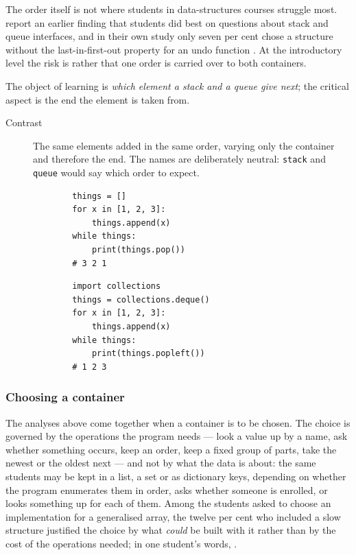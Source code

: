 The order itself is not where students in data-structures courses struggle
most. \textcite[p.~170]{Zingaro2018DataStructures} report an earlier finding
that students did best on questions about stack and queue interfaces, and in
their own study only seven per cent chose a structure without the
last-in-first-out property for an undo function
\autocite[p.~173]{Zingaro2018DataStructures}. At the introductory level the
risk is rather that one order is carried over to both containers.

The object of learning is \emph{which element a stack and a queue give next};
the critical aspect is the end the element is taken from.

\begin{description}
  \item[Contrast] The same elements added in the same order, varying only the
    container and therefore the end. The names are deliberately neutral:
    \texttt{stack} and \texttt{queue} would say which
    order to expect.

    \hfill
    \begin{minipage}[t]{0.45\columnwidth}
      \begin{verbatim}
        things = []
        for x in [1, 2, 3]:
            things.append(x)
        while things:
            print(things.pop())
        # 3 2 1
      \end{verbatim}
    \end{minipage}
    \hfill
    \begin{minipage}[t]{0.45\columnwidth}
      \begin{verbatim}
        import collections
        things = collections.deque()
        for x in [1, 2, 3]:
            things.append(x)
        while things:
            print(things.popleft())
        # 1 2 3
      \end{verbatim}
    \end{minipage}
\end{description}

\subsubsection{Choosing a container}

The analyses above come together when a container is to be chosen. The choice
is governed by the operations the program needs --- look a value up by a name,
ask whether something occurs, keep an order, keep a fixed group of parts, take
the newest or the oldest next --- and not by what the data is about: the same
students may be kept in a list, a set or as dictionary keys, depending on
whether the program enumerates them in order, asks whether someone is
enrolled, or looks something up for each of them.
Among the students \textcite[p.~173]{Zingaro2018DataStructures} asked to
choose an implementation for a generalised array, the twelve per cent who
included a slow structure justified the choice by what \emph{could} be built
with it rather than by the cost of the operations needed; in one student's
words,
.


